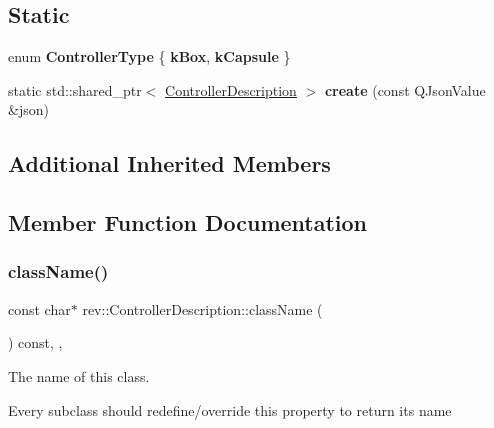 \subsection*{Static}
\begin{DoxyCompactItemize}
\item 
\mbox{\label{classrev_1_1_controller_description_abdd36062c3af5cb2803f427767fc8787}} 
enum {\bfseries Controller\+Type} \{ {\bfseries k\+Box}, 
{\bfseries k\+Capsule}
 \}
\item 
\mbox{\label{classrev_1_1_controller_description_a7f3283c20640f0e365a3136bf5a21caf}} 
static std\+::shared\+\_\+ptr$<$ \mbox{\hyperlink{classrev_1_1_controller_description}{Controller\+Description}} $>$ {\bfseries create} (const Q\+Json\+Value \&json)
\end{DoxyCompactItemize}
\subsection*{Additional Inherited Members}


\subsection{Member Function Documentation}
\mbox{\label{classrev_1_1_controller_description_a8170f2acabf587228bae29aba6c1a90b}} 
\subsubsection{\texorpdfstring{className()}{className()}}
{\footnotesize\ttfamily const char$\ast$ rev\+::\+Controller\+Description\+::class\+Name (\begin{DoxyParamCaption}{ }\end{DoxyParamCaption}) const\hspace{0.3cm}{\ttfamily [inline]}, {\ttfamily [override]}, {\ttfamily [virtual]}}



The name of this class. 

Every subclass should redefine/override this property to return its name 

